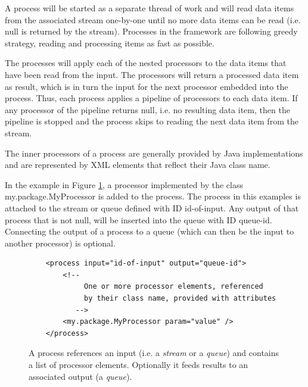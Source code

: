 A process will be started as a separate thread of work and will read
data items from the associated stream one-by-one until no more data
items can be read (i.e.  {\ttfamily null} is returned by the
stream). Processes in the \streams framework are following greedy
strategy, reading and processing items as fast as possible.

The processes will apply each of the nested processors to the data
items that have been read from the input. The processors will return
a processed data item as result, which is in turn the input for the
next processor embedded into the process. Thus, each process applies
a pipeline of processors to each data item. If any processor of the
pipeline returns {\ttfamily null}, i.e. no resulting data item, then
the pipeline is stopped and the process skips to reading the next
data item from the stream.

The inner processors of a process are generally provided by Java
implementations and are represented by XML elements that reflect
their Java class name. 

In the example in Figure \ref{fig:processXml}, a processor implemented
by the class {\ttfamily my.package.MyProcessor} is added to the
process. The process in this examples is attached to the stream or
queue defined with ID {\ttfamily id-of-input}. Any output of that
process that is not {\ttfamily null}, will be inserted into the queue
with ID {\ttfamily queue-id}. Connecting the output of a process to a
queue (which can then be the input to another processor) is optional.

\begin{figure}[h!]
  \centering
  \begin{lstlisting}
    <process input="id-of-input" output="queue-id">
        <!-- 
             One or more processor elements, referenced
             by their class name, provided with attributes
           -->
        <my.package.MyProcessor param="value" />
    </process>
  \end{lstlisting}
  \caption{\label{fig:processXml}A process references an input
    (i.e. a {\em stream} or a {\em queue}) and contains a list of
    processor elements. Optionally it feeds results to an associated
    output (a {\em queue}).}
\end{figure}

%

